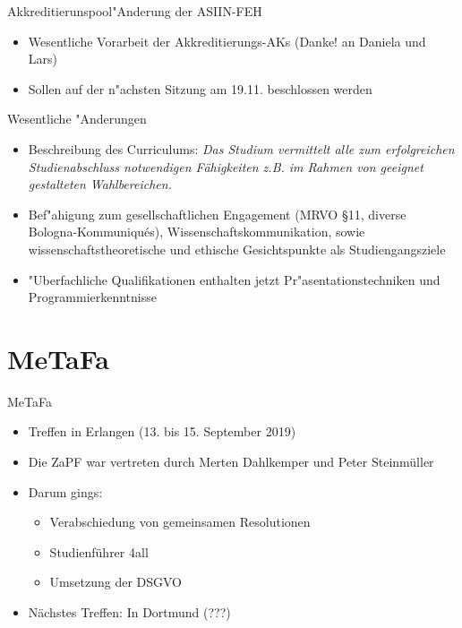 \documentclass[compress, aspectratio=169]{beamer}
\begin{document}
\begin{frame}{Akkreditierunspool}{"Anderung der ASIIN-FEH}
	\begin{itemize}
		\item Wesentliche Vorarbeit der Akkreditierungs-AKs (Danke! an Daniela und Lars)
		\item Sollen auf der n"achsten Sitzung am 19.11. beschlossen werden
	\end{itemize}
	\pause
	\begin{block}{Wesentliche "Anderungen}
	\begin{itemize}
		\scriptsize
		\item Beschreibung des Curriculums: \textit{\glqq Das Studium vermittelt alle zum erfolgreichen Studienabschluss notwendigen Fähigkeiten z.B. im Rahmen von geeignet gestalteten Wahlbereichen.\grqq}
		\item Bef"ahigung zum gesellschaftlichen Engagement (MRVO \S 11, diverse Bologna-Kommuniqu\'es), Wissenschaftskommunikation, sowie wissenschaftstheoretische und ethische Gesichtspunkte als Studiengangsziele
		\item "Uberfachliche Qualifikationen enthalten jetzt Pr"asentationstechniken und Programmierkenntnisse 
	\end{itemize}		
	\end{block}
\end{frame}

\section{MeTaFa}

 \begin{frame}{MeTaFa}
  \begin{itemize}
    \item Treffen in Erlangen (13. bis 15. September 2019)
    \item Die ZaPF war vertreten durch Merten Dahlkemper und Peter Steinmüller
    \item Darum gings:
    \begin{itemize}
        \item Verabschiedung von gemeinsamen Resolutionen
        \item Studienführer 4all
        \item Umsetzung der DSGVO
    \end{itemize}
    \item Nächstes Treffen: In Dortmund (???)
   \end{itemize}
 \end{frame}
\end{document}
